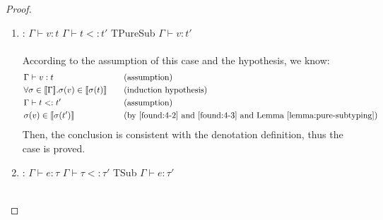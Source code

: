 \begin{proof}
\begin{enumerate}[label=Case]
{\begin{alignat}{2}
  &\Gamma\vdash e_2 : \tau_2 \ptag{assumption} \label{found:3-3} \\
  &\forall \sigma \in \denot{\Gamma}. \sigma(e_2) \in \denot{\sigma(\tau_2)} \ptag{induction hypothesis} \label{found:3-4} \\
  &\forall \alpha.\msteptr{\alpha}{e_1 \oplus e_2}{[]}{e_1} \ptag{by the semantics of evaluation} \label{found:3-5} \\
  &\forall \alpha.\msteptr{\alpha}{e_1 \oplus e_2}{[]}{e_2} \ptag{by the semantics of evaluation} \label{found:3-6} \\
  &\sigma(e_1 \oplus e_2) \in \denot{\sigma(\tau_1)} \ptag{by \ref{found:3-2} and \ref{found:3-5} and Lemma~\ref{lemma:pure-denot}} \label{found:3-7} \\
  &\sigma(e_1 \oplus e_2) \in \denot{\sigma(\tau_2)} \ptag{by \ref{found:3-4} and \ref{found:3-6} and Lemma~\ref{lemma:pure-denot}} \label{found:3-8} \\
  &\sigma(e_1 \oplus e_2) \in \denot{\sigma(\tau_1 \interty \tau_2)} \ptag{by definition of denotation} \label{found:3-9}
  \end{alignat}}\noindent
Then, the conclusion is consistent with the denotation definition, thus the case is proved.
\item:
{\footnotesize
\mprooftr{18mm}
{$\Gamma \vdash v : t$ \quad
$\Gamma \vdash t <: t'$}
{TPureSub}
{$\Gamma \vdash v : t'$}
\ \\ \ \\}
According to the assumption of this case and the hypothesis, we know:
{\footnotesize\begin{alignat}{2}
  \setcounter{equation}{0}
  &\Gamma\vdash v : t \ptag{assumption} \label{found:4-1} \\
  &\forall \sigma \in \denot{\Gamma}. \sigma(v) \in \denot{\sigma(t)} \ptag{induction hypothesis} \label{found:4-2} \\
  &\Gamma\vdash t <: t' \ptag{assumption} \label{found:4-3} \\
  &\sigma(v) \in \denot{\sigma(t')} \ptag{by \ref{found:4-2} and \ref{found:4-3} and Lemma~\ref{lemma:pure-subtyping}} \label{found:4-4}
  \end{alignat}}\noindent
Then, the conclusion is consistent with the denotation definition, thus the case is proved.
\item:
{\footnotesize
\mprooftr{18mm}
{$\Gamma \vdash e : \tau$ \quad
$\Gamma \vdash \tau <: \tau'$}
{TSub}
{$\Gamma \vdash e : \tau'$}
\ \\ \ \\}

\end{enumerate}
\end{proof}
